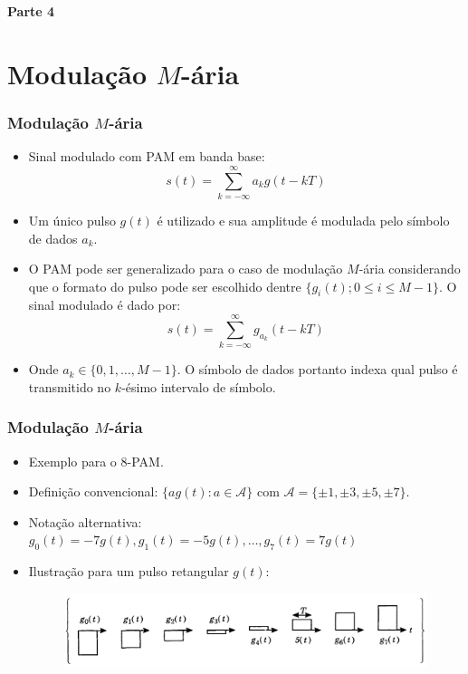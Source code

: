 
\begin{frame}
	\begin{block}{\centering\large\bfseries Parte 4}
		\centering\large\insertpart
	\end{block}
\end{frame}


\section{Modulação $M$-ária}

\begin{frame}
	\frametitle{Modulação $M$-ária}

	\begin{itemize}
	    \item Sinal modulado com PAM em banda base:
	    \begin{equation*}
		  s(t) = \sum_{k=-\infty}^{\infty} a_k g(t-kT)
	    \end{equation*}
	    \item Um único pulso $g(t)$ é utilizado e sua amplitude é modulada pelo símbolo de dados $a_k$.
	    \item O PAM pode ser generalizado para o caso de modulação $M$-ária considerando que o formato do pulso pode ser escolhido dentre $\{g_i(t) ; 0 \leq i \leq M-1 \}$. O sinal modulado é dado por:
	    \begin{equation*}
		  s(t) = \sum_{k=-\infty}^{\infty} g_{a_k}(t-kT)
	    \end{equation*}
	    \item Onde $a_k \in \{0, 1, \ldots, M-1 \}$. O símbolo de dados portanto indexa qual pulso é transmitido no $k$-ésimo intervalo de símbolo.
	\end{itemize}			
\end{frame}

\begin{frame}
	\frametitle{Modulação $M$-ária}

	\begin{itemize}
	    \item Exemplo para o 8-PAM.
	    \item Definição convencional: $\{ag(t) : a \in \mathcal{A} \}$ com $\mathcal{A} = \{\pm 1, \pm 3, \pm 5, \pm7 \}$.
	    \item Notação alternativa: $g_0(t)=-7g(t), g_1(t)=-5g(t),\ldots, g_7(t)=7g(t)$
	    \item Ilustração para um pulso retangular $g(t)$:
	    \begin{figure}[t]	
	      \begin{center}
		\includegraphics[width=0.75\columnwidth]{figs/adv_01}
	      \end{center}
	    \end{figure}
	\end{itemize}			
\end{frame}

